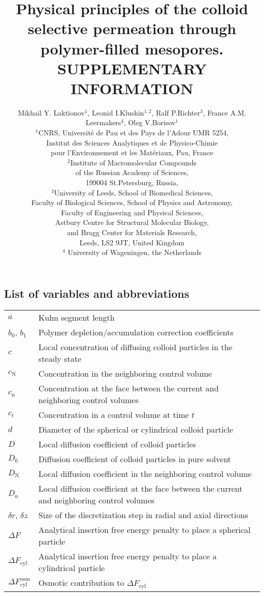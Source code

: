 \documentclass[10pt, a4paper]{article}
\title{Physical principles of the colloid selective permeation through polymer-filled mesopores.\\
        SUPPLEMENTARY INFORMATION}
\author{Mikhail Y. Laktionov$^1$, Leonid I.Klushin$^{1,2}$, Ralf P.Richter$^3$, France A.M. Leermakers$^4$, Oleg V.Borisov$^1$\\
$^{1}$CNRS, Universit\'e de Pau et des Pays de l'Adour UMR 5254,\\
Institut des Sciences Analytiques et de Physico-Chimie\\
pour l'Environnement et les Mat\'eriaux, Pau, France \\
$^{2}$Institute of Macromolecular Compounds \\
of the Russian Academy of Sciences, \\
199004 St.Petersburg, Russia,\\
$^{3}$University of Leeds, School of Biomedical Sciences, \\
Faculty of Biological Sciences, 
School of Physics and Astronomy, \\
Faculty of Engineering and Physical Sciences,\\  
Astbury Centre for Structural Molecular Biology,\\ 
and Bragg Center for Materials Research,\\ 
Leeds, LS2 9JT, United Kingdom\\
$^{4}$ University of Wageningen, the Netherlands}
\begin{document}
\maketitle

\pagebreak
\subsection*{List of variables and abbreviations}

\begin{tabularx}{\linewidth}{l X}
    $a$ & Kuhn segment length \\
    $b_0$, $b_1$ & Polymer depletion/accumulation correction coefficients \\
    $c$ & Local concentration of diffusing colloid particles in the steady state \\
    $c_{\textrm{N}}$ & Concentration in the neighboring control volume \\
    $c_{\textrm{n}}$ & Concentration at the face between the current and neighboring control volumes \\
    $c_{t}$ & Concentration in a control volume at time $t$ \\
    $d$ & Diameter of the spherical or cylindrical colloid particle \\
    $D$ & Local diffusion coefficient of colloid particles \\
    $D_0$ & Diffusion coefficient of colloid particles in pure solvent \\
    $D_{\textrm{N}}$ & Local diffusion coefficient in the neighboring control volume \\
    $D_{\textrm{n}}$ & Local diffusion coefficient at the face between the current and neighboring control volumes \\
    $\delta r$, $\delta z$ & Size of the discretization step in radial and axial directions \\
    $\Delta F$ & Analytical insertion free energy penalty to place a spherical particle \\
    $\Delta F_{\textrm{cyl}}$ & Analytical insertion free energy penalty to place a cylindrical particle \\
    $\Delta F_{\textrm{cyl}}^{\textrm{osm}}$ & Osmotic contribution to $\Delta F_{\textrm{cyl}}$ \\

\end{tabularx}
\end{document}
